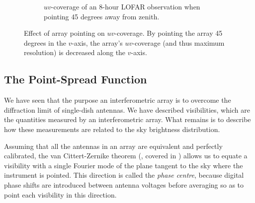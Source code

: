 \begin{figure}[ht]
\begin{subfigure}{.40\textwidth}
\caption{\label{fig.lofar.uvcoverage.elsewhere} $uv$-coverage of an 8-hour LOFAR observation when pointing 45 degrees away from zenith.}
\end{subfigure}
\caption{\label{fig.uvcoverage.lofar} Effect of array pointing on $uv$-coverage. By pointing the array 45 degrees in the $v$-axis, the array's $uv$-coverage (and thus maximum resolution) is decreased along the $v$-axis.}
\end{figure}


\subsection{The Point-Spread Function}\label{sec.imag.psf}

\pg
We have seen that the purpose an interferometric array is to overcome the diffraction limit of single-dish antennas. We have described visibilities, which are the quantities measured by an interferometric array. What remains is to describe how these measurements are related to the sky brightness distribution.

\pg
Assuming that all the antennas in an array are equivalent and perfectly calibrated, the van Cittert-Zernike theorem (, covered in ) allows us to equate a visibility with a single Fourier mode of the plane tangent to the sky where the instrument is pointed. This direction is called the \emph{phase centre}, because digital phase shifts are introduced between antenna voltages before averaging so as to point each visibility in this direction. 

